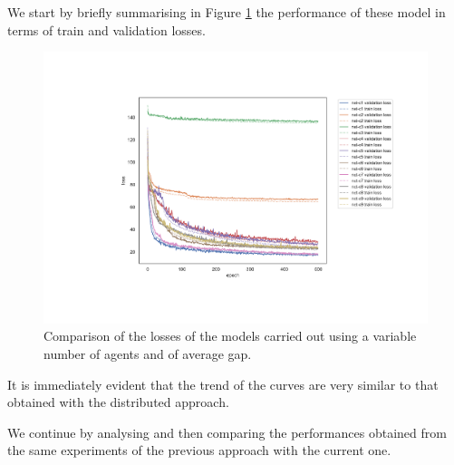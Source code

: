 We start by briefly summarising in Figure \ref{fig:commlossallt} the performance 
of these model in terms of train and validation losses.
\begin{figure}[!htb]
	\centering
	\includegraphics[width=.8\textwidth]{contents/images/task1-comm/loss-communication-all@}%
	\caption[Comparison of losses of the second set of experiments.]{Comparison 
	of the losses of the models carried out using a variable number of agents and of 
	average gap.}
	\label{fig:commlossallt}
\end{figure}
It is immediately evident that the trend of the curves are very similar to that 
obtained with the distributed approach. 

We continue by analysing and then comparing the performances obtained from 
the same experiments of the previous approach with the current one.


